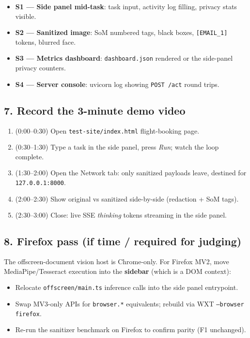 \documentclass[11pt,a4paper]{article}
\newcommand{\code}[1]{\texttt{#1}}
\newcommand{\todo}{\textcolor{amber}{$\square$}}
\begin{document}
\begin{itemize}
\begin{itemize}
\item[\todo] \textbf{S1 --- Side panel mid-task}: task input, activity log filling, privacy stats visible.
\item[\todo] \textbf{S2 --- Sanitized image}: SoM numbered tags, black boxes, \code{[EMAIL\_1]} tokens, blurred face.
\item[\todo] \textbf{S3 --- Metrics dashboard}: \code{dashboard.json} rendered or the side-panel privacy counters.
\item[\todo] \textbf{S4 --- Server console}: uvicorn log showing \code{POST /act} round trips.
\end{itemize}

\subsection{7. Record the 3-minute demo video}

\begin{enumerate}
\item (0:00--0:30) Open \code{test-site/index.html} flight-booking page.
\item (0:30--1:30) Type a task in the side panel, press \emph{Run}; watch the loop complete.
\item (1:30--2:00) Open the Network tab: only sanitized payloads leave, destined for \code{127.0.0.1:8000}.
\item (2:00--2:30) Show original vs sanitized side-by-side (redaction + SoM tags).
\item (2:30--3:00) Close: live SSE \emph{thinking} tokens streaming in the side panel.
\end{enumerate}

\subsection{8. Firefox pass (if time / required for judging)}

The offscreen-document vision host is Chrome-only. For Firefox MV2, move MediaPipe/Tesseract execution into the \textbf{sidebar} (which is a DOM context):

\begin{itemize}
\item[\todo] Relocate \code{offscreen/main.ts} inference calls into the side panel entrypoint.
\item[\todo] Swap MV3-only APIs for \code{browser.*} equivalents; rebuild via WXT \code{--browser firefox}.
\item[\todo] Re-run the sanitizer benchmark on Firefox to confirm parity (F1 unchanged).
\end{itemize}


\end{itemize}
\end{document}
